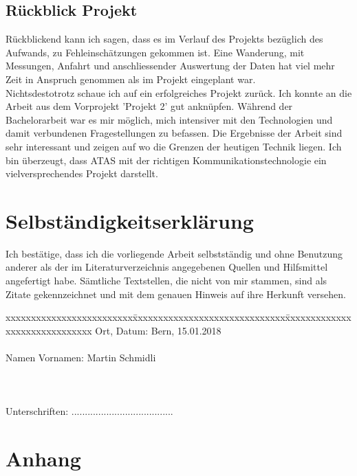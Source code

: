 \documentclass[11pt,english,german]{report}
\theoremstyle{definition}
\begin{document}
\section{Rückblick Projekt}
Rückblickend kann ich sagen, dass es im Verlauf des Projekts bezüglich des Aufwands, zu Fehleinschätzungen gekommen ist. Eine Wanderung, mit Messungen, Anfahrt und anschliessender Auswertung der Daten hat viel mehr Zeit in Anspruch genommen als im Projekt eingeplant war.\\[0.3cm]
Nichtsdestotrotz schaue ich auf ein erfolgreiches Projekt zurück. Ich konnte an die Arbeit aus dem Vorprojekt 'Projekt 2' gut anknüpfen. Während der Bachelorarbeit war es mir möglich, mich intensiver mit den Technologien und damit verbundenen Fragestellungen zu befassen. Die Ergebnisse der Arbeit sind sehr interessant und zeigen auf wo die Grenzen der heutigen Technik liegen. Ich bin überzeugt, dass ATAS mit der richtigen Kommunikationstechnologie ein vielversprechendes Projekt darstellt.

\chapter*{Selbständigkeitserklärung}
\label{chap:selbstaendigkeitserklaerung}

\vspace*{10mm} 

Ich bestätige, dass ich die vorliegende Arbeit selbstständig und ohne Benutzung anderer als der im Literaturverzeichnis angegebenen Quellen und Hilfsmittel angefertigt habe. Sämtliche Textstellen, die nicht von mir stammen, sind als Zitate gekennzeichnet und mit dem genauen Hinweis auf ihre Herkunft versehen. 

\vspace{15mm}

\begin{tabbing}
xxxxxxxxxxxxxxxxxxxxxxxxx\=xxxxxxxxxxxxxxxxxxxxxxxxxxxxxx\=xxxxxxxxxxxxxxxxxxxxxxxxxxxxxx\kill
Ort, Datum:\> Bern, 15.01.2018 \\ \\
Namen Vornamen:\> Martin Schmidli  \\ \\ \\ \\ 
Unterschriften:\> ...................................... \\
\end{tabbing}

\chapter*{Anhang}
\end{document}
